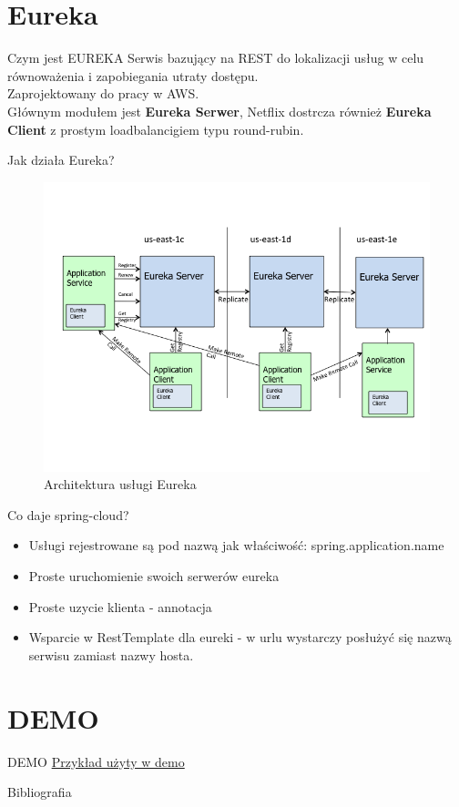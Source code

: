 \documentclass[epic,eepic,aspectratio=169,12pt]{beamer}
\begin{document}
	\section{Eureka}
	\begin{frame}{Czym jest EUREKA}
		Serwis bazujący na REST do lokalizacji usług w celu równoważenia i zapobiegania utraty dostępu.\\
		Zaprojektowany do pracy w AWS.\\
		Głównym modułem jest \textbf{Eureka Serwer}, Netflix dostrcza również \textbf{Eureka Client} z prostym loadbalancigiem typu round-rubin.
	\end{frame}
	\begin{frame}{Jak działa Eureka?}
		\begin{figure}
			\centering
			\includegraphics[width=0.6\linewidth]{eureka_architecture}
			\caption{Architektura usługi Eureka}
			\label{fig:eureka_architecture}
			\end{figure}

	\end{frame}
	\begin{frame}{Co daje spring-cloud?}
		\begin{itemize}
			\item Usługi rejestrowane są pod nazwą jak właściwość:  spring.application.name
			\item Proste uruchomienie swoich serwerów eureka
			\item Proste uzycie klienta - annotacja
			\item Wsparcie w RestTemplate dla eureki - w urlu wystarczy posłużyć się nazwą serwisu zamiast nazwy hosta.
		\end{itemize}
	\end{frame}
	\section{DEMO}
	\begin{frame}{DEMO}
		\href{https://github.com/krzpob/sample-eureka}{Przykład użyty w demo}
	\end{frame}
	\nocite{multi-zone}
	\nocite{netflix:eureka}
	\begin{frame}{Bibliografia}
		\printbibliography
	\end{frame}
\end{document}
